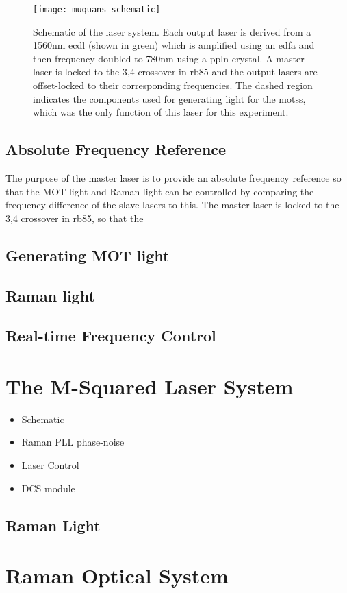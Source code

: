 \begin{figure}
    \texttt{[image: muquans\_schematic]}
    \caption[\Muquans Laser System Diagram]{Schematic of the \Muquans laser system. Each output laser is derived from a 1560nm \acs{ecdl} (shown in green) which is amplified using an \acs{edfa} and then frequency-doubled to 780nm using a \acs{ppln} crystal. A master laser is locked to the 3,4 crossover in \ac{rb85} and the output lasers are offset-locked to their corresponding frequencies. The dashed region indicates the components used for generating light for the \acp{mots}, which was the only function of this laser for this experiment.}\label{fig:muquans_schematic}
\end{figure}
\subsection{Absolute Frequency Reference}
The purpose of the master laser is to provide an absolute frequency reference so that the MOT light and Raman light can be controlled by comparing the frequency difference of the slave lasers to this. The master laser is locked to the 3,4 crossover in \ac{rb85}, so that the 
\subsection{Generating MOT light}
\subsection{Raman light}
\subsection{Real-time Frequency Control}
\section{The M-Squared Laser System}\label{sec:setup_msquared}
\begin{itemize}
    \item Schematic
    \item Raman PLL phase-noise
    \item Laser Control
    \item DCS module
\end{itemize}
\subsection{Raman Light}
\section{Raman Optical System}\label{sec:setup_ramanoptics}
